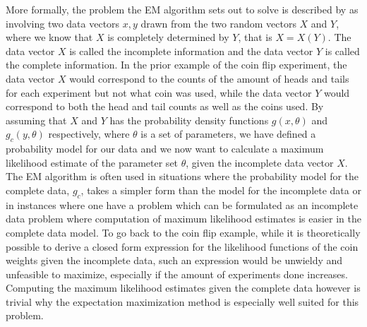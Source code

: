 More formally, the problem the EM algorithm sets out to solve is described by \citet{mclachlan2007algorithm} as involving two data vectors $x, y$ drawn from the two random vectors $X$ and $Y$, where we know that $X$ is completely determined by $Y$, that is $X=X(Y)$. The data vector $X$ is called the incomplete information and the data vector $Y$ is called the complete information. In the prior example of the coin flip experiment, the data vector $X$ would correspond to the counts of the amount of heads and tails for each experiment but not what coin was used, while the data vector $Y$ would correspond to both the head and tail counts as well as the coins used. By assuming that $X$ and $Y$ has the probability density functions $g(x,\theta)$ and $g_c(y,\theta)$ respectively, where $\theta$ is a set of parameters, we have defined a probability model for our data and we now want to calculate a maximum likelihood estimate of the parameter set $\theta$, given the incomplete data vector $X$. The EM algorithm is often used in situations where the probability model for the complete data, $g_c$, takes a simpler form than the model for the incomplete data or in instances where one have a problem which can be formulated as an incomplete data problem where computation of maximum likelihood estimates is easier in the complete data model. To go back to the coin flip example, while it is theoretically possible to derive a closed form expression for the likelihood functions of the coin weights given the incomplete data, such an expression would be unwieldy and unfeasible to maximize, especially if the amount of experiments done increases. Computing the maximum likelihood estimates given the complete data however is trivial why the expectation maximization method is especially well suited for this problem.

